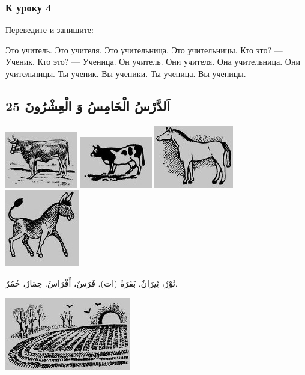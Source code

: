 \documentclass[a5paper]{article}
\begin{document}
\subsubsection{К уроку 4}
Переведите и запишите:

Это учитель. Это учителя. Это учительница. Это учительницы. Кто это? — Ученик. Кто это? — Ученица. Он учитель. Они учителя. Она учительница. Они учительницы. Ты ученик. Вы ученики. Ты ученица. Вы ученицы.

\subsection{25 اَلدَّرْسُ الْخَامِسُ وَ الْعِشْرُونَ}
 \includegraphics[width=1.2398in,height=0.9689in]{MuhammadBagauddinlatinized-img045.jpg}   \includegraphics[width=1.25in,height=0.8752in]{MuhammadBagauddinlatinized-img046.jpg}   \includegraphics[width=1.3646in,height=1.0728in]{MuhammadBagauddinlatinized-img047.jpg}   \includegraphics[width=1.2811in,height=1.3228in]{MuhammadBagauddinlatinized-img048.jpg} 

ثَوْرٌ، ثِيرَانٌ. بَقَرَةٌ (ات). فَرَسٌ، أَفْرَاسٌ. حِمَارٌ، حُمُرٌ. 

 \includegraphics[width=2.1665in,height=1.25in]{MuhammadBagauddinlatinized-img049.jpg} 
\end{document}
